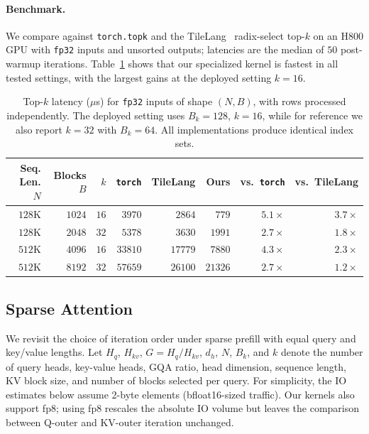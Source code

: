 \documentclass{llmxive}
\begin{document}
\paragraph{Benchmark.}
We compare against \texttt{torch.topk} and the TileLang~\citep{wang2025tilelangcomposabletiledprogramming} radix-select top-$k$ on an H800 GPU with \texttt{fp32} inputs and unsorted outputs; latencies are the median of $50$ post-warmup iterations. Table~\ref{tab:topk_latency} shows that our specialized kernel is fastest in all tested settings, with the largest gains at the deployed setting $k = 16$.

\begin{table}[!htbp]
\centering
\begin{tabular}{rrrrrrrr}
\toprule
Seq. Len. $N$ & Blocks $B$ & $k$ & \texttt{torch} & TileLang & Ours & vs.\ \texttt{torch} & vs.\ TileLang \\
\midrule
$128$K & $1024$ & $16$ & $3970$  & $2864$  & $779$   & $5.1\times$ & $3.7\times$ \\
$128$K & $2048$ & $32$ & $5378$  & $3630$  & $1991$  & $2.7\times$ & $1.8\times$ \\
$512$K & $4096$ & $16$ & $33810$ & $17779$ & $7880$  & $4.3\times$ & $2.3\times$ \\
$512$K & $8192$ & $32$ & $57659$ & $26100$ & $21326$ & $2.7\times$ & $1.2\times$ \\
\bottomrule
\end{tabular}
\caption{Top-$k$ latency ($\mu$s) for \texttt{fp32} inputs of shape $(N, B)$, with rows processed independently. The deployed setting uses $B_k = 128$, $k = 16$, while for reference we also report $k = 32$ with $B_k = 64$. All implementations produce identical index sets.}

\label{tab:topk_latency}
\end{table}
\FloatBarrier

\subsection{Sparse Attention}
\label{sec:kernel:sparse_attn}

We revisit the choice of iteration order under sparse prefill with equal query and key/value lengths. Let $H_q$, $H_{kv}$, $G = H_q / H_{kv}$, $d_h$, $N$, $B_k$, and $k$ denote the number of query heads, key-value heads, GQA ratio, head dimension, sequence length, KV block size, and number of blocks selected per query.  For simplicity, the IO estimates below assume 2-byte elements (bfloat16-sized traffic). Our kernels also support fp8; using fp8 rescales the absolute IO volume but leaves the comparison between Q-outer and KV-outer iteration unchanged.
\end{document}
